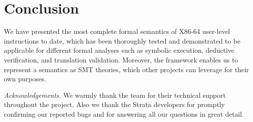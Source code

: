 \section{Conclusion}\label{sec:conc}

We have presented the most complete formal semantics of X86-64 user-level instructions
to date, which has been thoroughly tested and demonstrated  to be applicable
for different formal analyses such as symbolic execution, deductive
verification, and translation validation.
Moreover, the \K framework enables us to represent a semantics as SMT theories,
which other projects can
leverage for their own purposes.


\textit{Acknowledgements.}
We warmly thank the \K team
   for their technical support throughout the project.  Also we thank the Strata
   developers for promptly confirming
   our reported bugs and for answering all our questions in great detail.
   